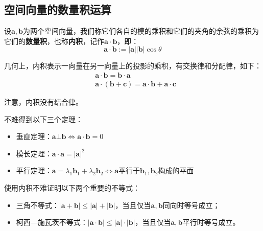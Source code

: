 \subsection{空间向量的数量积运算}

\begin{definition}[数量积]
设$\boldsymbol{a},\boldsymbol{b}$为两个空间向量，我们称它们各自的模的乘积和它们的夹角的余弦的乘积为它们的{\bf 数量积}，也称{\bf 内积}，记作$\boldsymbol{a}\cdot \boldsymbol{b}$，即：
\[
\boldsymbol{a}\cdot \boldsymbol{b}:=\left| \boldsymbol{a} \right|\left| \boldsymbol{b} \right|\cos \theta
\]
\end{definition}

几何上，内积表示一向量在另一向量上的投影的乘积，有交换律和分配律，如下：
\begin{align*}
&\boldsymbol{a}\cdot \boldsymbol{b}=\boldsymbol{b}\cdot \boldsymbol{a} \\
&\boldsymbol{a}\cdot \left( \boldsymbol{b}+\boldsymbol{c} \right) =\boldsymbol{a}\cdot \boldsymbol{b}+\boldsymbol{a}\cdot \boldsymbol{c}
\end{align*}

\begin{tcolorbox}
注意，内积没有结合律。
\end{tcolorbox}

\begin{theorem}
不难得到以下三个定理：
\begin{itemize}
    \item 垂直定理：$\boldsymbol{a}\bot \boldsymbol{b}\Leftrightarrow \boldsymbol{a}\cdot \boldsymbol{b}=0$
    \item 模长定理：$\boldsymbol{a}\cdot \boldsymbol{a}=\left| \boldsymbol{a} \right|^2$
    \item 平行定理：$\boldsymbol{a}=\lambda _1\boldsymbol{b}_1+\lambda _2\boldsymbol{b}_2\Leftrightarrow \boldsymbol{a}\text{平行于}\boldsymbol{b}_1,\boldsymbol{b}_2\text{构成的平面}$
\end{itemize}
\end{theorem}

\begin{theorem}
使用内积不难证明以下两个重要的不等式：
\begin{itemize}
    \item 三角不等式：$\left| \boldsymbol{a}+\boldsymbol{b} \right|\leqslant \left| \boldsymbol{a} \right|+\left| \boldsymbol{b} \right|$，当且仅当$\boldsymbol{a},\boldsymbol{b}$同向时等号成立；
    \item 柯西—施瓦茨不等式：$\left| \boldsymbol{a}\cdot \boldsymbol{b} \right|\leqslant \left| \boldsymbol{a} \right|\cdot \left| \boldsymbol{b} \right|$，当且仅当$\boldsymbol{a},\boldsymbol{b}$平行时等号成立。
\end{itemize}
\end{theorem}

